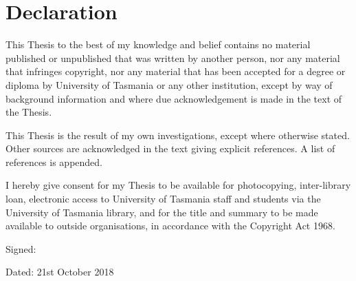 \chapter{Declaration}

This Thesis to the best of my knowledge and belief contains no material published or unpublished that was written by another person, nor any material that infringes copyright, nor any material that has been accepted for a degree or diploma by University of Tasmania or any other institution, except by way of background information and where due acknowledgement is made in the text of the Thesis.

This Thesis is the result of my own investigations, except where otherwise stated. Other sources are acknowledged in the text giving explicit references. A list of references is appended.


I hereby give consent for my Thesis to be available for photocopying, inter-library loan, electronic access to University of Tasmania staff and students via the University of Tasmania library, and for the title and summary to be made available to outside organisations, in accordance with the Copyright Act 1968.


   \bigskip
   \bigskip

Signed:

   \bigskip
   \bigskip

Dated: 21st October 2018      %